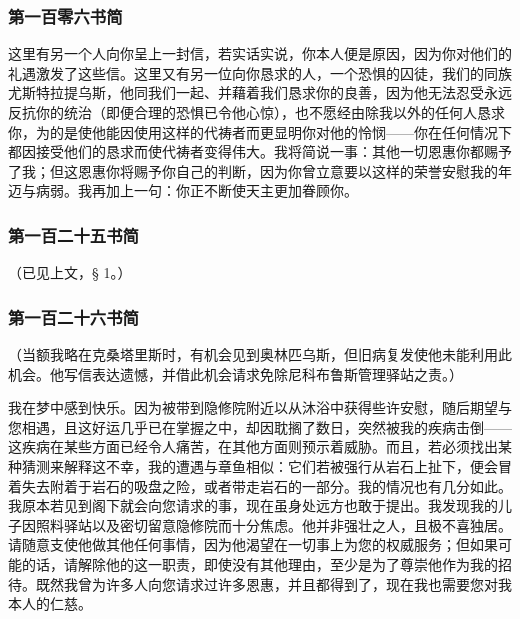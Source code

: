 
\subsubsection{第一百零六书简}

这里有另一个人向你呈上一封信，若实话实说，你本人便是原因，因为你对他们的礼遇激发了这些信。这里又有另一位向你恳求的人，一个恐惧的囚徒，我们的同族尤斯特拉提乌斯，他同我们一起、并藉着我们恳求你的良善，因为他无法忍受永远反抗你的统治（即便合理的恐惧已令他心惊），也不愿经由除我以外的任何人恳求你，为的是使他能因使用这样的代祷者而更显明你对他的怜悯——你在任何情况下都因接受他们的恳求而使代祷者变得伟大。我将简说一事：其他一切恩惠你都赐予了我；但这恩惠你将赐予你自己的判断，因为你曾立意要以这样的荣誉安慰我的年迈与病弱。我再加上一句：你正不断使天主更加眷顾你。\par


\subsubsection{第一百二十五书简}

（已见上文，§ 1。）\par


\subsubsection{第一百二十六书简}

（当额我略在克桑塔里斯时，有机会见到奥林匹乌斯，但旧病复发使他未能利用此机会。他写信表达遗憾，并借此机会请求免除尼科布鲁斯管理驿站之责。）\par

我在梦中感到快乐。因为被带到隐修院附近以从沐浴中获得些许安慰，随后期望与您相遇，且这好运几乎已在掌握之中，却因耽搁了数日，突然被我的疾病击倒——这疾病在某些方面已经令人痛苦，在其他方面则预示着威胁。而且，若必须找出某种猜测来解释这不幸，我的遭遇与章鱼相似：它们若被强行从岩石上扯下，便会冒着失去附着于岩石的吸盘之险，或者带走岩石的一部分。我的情况也有几分如此。我原本若见到阁下就会向您请求的事，现在虽身处远方也敢于提出。我发现我的儿子因照料驿站以及密切留意隐修院而十分焦虑。他并非强壮之人，且极不喜独居。请随意支使他做其他任何事情，因为他渴望在一切事上为您的权威服务；但如果可能的话，请解除他的这一职责，即使没有其他理由，至少是为了尊崇他作为我的招待。既然我曾为许多人向您请求过许多恩惠，并且都得到了，现在我也需要您对我本人的仁慈。\par

